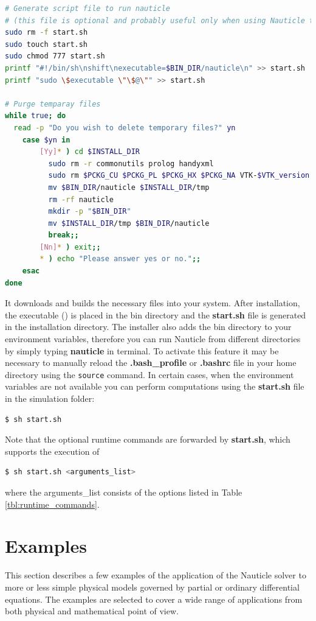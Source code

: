\documentclass[a4paper,12pt,openany]{book}
\theoremstyle{break}
\begin{document}
\begin{example}{\installer{}}{}
\begin{lstlisting}[language=bash]
# Generate script file to run nauticle
# (this file is optional and probably useful only when using Nauticle through ssh)
sudo rm -f start.sh
sudo touch start.sh
sudo chmod 777 start.sh
printf "#!/bin/sh\nshift\nexecutable=$BIN_DIR/nauticle\n" >> start.sh
printf "sudo \$executable \"\$@\"" >> start.sh

# Purge temparay files
while true; do
  read -p "Do you wish to delete temporary files?" yn
    case $yn in
        [Yy]* ) cd $INSTALL_DIR
          sudo rm -r commonutils prolog handyxml
          sudo rm $PCKG_CU $PCKG_PL $PCKG_HX $PCKG_NA VTK-$VTK_version.zip
          mv $BIN_DIR/nauticle $INSTALL_DIR/tmp
          rm -rf nauticle
          mkdir -p "$BIN_DIR"
          mv $INSTALL_DIR/tmp $BIN_DIR/nauticle
          break;;
        [Nn]* ) exit;;
        * ) echo "Please answer yes or no.";;
    esac
done
\end{lstlisting}
\end{example}

It downloads and builds the necessary files into your system. After installation, the executable (\execname{}) is placed in the bin directory and the \textbf{start.sh} file is generated in the installation directory. The installer also adds the bin directory to your environment variables, therefore you can run Nauticle from different directories by simply typing \textbf{nauticle} in terminal. To activate this feature it may be necessary to manually reload the \textbf{.bash\_profile} or \textbf{.bashrc} file in your home directory using the \texttt{source} command.
In certain cases, when the environment variables are not available you can perform computations using the \textbf{start.sh} file in the simulation folder:
\begin{lstlisting}[language=bash]
  $ sh start.sh
\end{lstlisting}
Note that the optional runtime commands are forwarded by \textbf{start.sh}, which supports the execution of
\begin{lstlisting}[language=bash]
  $ sh start.sh <arguments_list>
\end{lstlisting}
where the arguments\_list consists of the options listed in Table \ref{tbl:runtime_commands}.

\section{Examples} \label{sec:examples}
This section describes a few examples of the application of the Nauticle solver to more or less simple physical models governed by partial or ordinary differential equations. The examples are selected to cover a wide range of applications from both physical and mathematical point of view.
\end{document}

